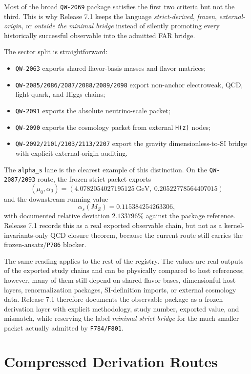 \documentclass[11pt,a4paper]{article}
\begin{document}
Most of the broad \texttt{QW-2069} package satisfies the first two criteria but
not the third. This is why Release 7.1 keeps the language \emph{strict-derived},
\emph{frozen}, \emph{external-origin}, or \emph{outside the minimal bridge}
instead of silently promoting every historically successful observable into the
admitted FAR bridge.

The sector split is straightforward:
\begin{itemize}
  \item \texttt{QW-2063} exports shared flavor-basis masses and flavor matrices;
  \item \texttt{QW-2085/2086/2087/2088/2089/2098} export non-anchor electroweak, QCD, light-quark, and Higgs chains;
  \item \texttt{QW-2091} exports the absolute neutrino-scale packet;
  \item \texttt{QW-2090} exports the cosmology packet from external \texttt{H(z)} nodes;
  \item \texttt{QW-2092/2101/2103/2113/2207} export the gravity dimensionless-to-SI bridge with explicit external-origin auditing.
\end{itemize}

The \texttt{alpha\_s} lane is the clearest example of this distinction. On the
\texttt{QW-2087/2093} route, the frozen strict packet exports
\[
(\mu_0,\alpha_0)=\left(4.0782054027195125\ \mathrm{GeV},\ 0.20522778564407015\right)
\]
and the downstream running value
\[
\alpha_s(M_Z)=0.115384254263306,
\]
with documented relative deviation \(2.133796\%\) against the package
reference. Release 7.1 records this as a real exported observable chain, but
not as a kernel-invariants-only QCD closure theorem, because the current route
still carries the frozen-ansatz/\texttt{P786} blocker.

The same reading applies to the rest of the registry. The values are real
outputs of the exported study chains and can be physically compared to host
references; however, many of them still depend on shared flavor bases,
dimensionful host layers, renormalization packages, SI-definition imports, or
external cosmology data. Release 7.1 therefore documents the observable package
as a frozen derivation layer with explicit methodology, study number, exported
value, and mismatch, while reserving the label \emph{minimal strict bridge} for
the much smaller packet actually admitted by \texttt{F784/F801}.

\section{Compressed Derivation Routes}
\end{document}
